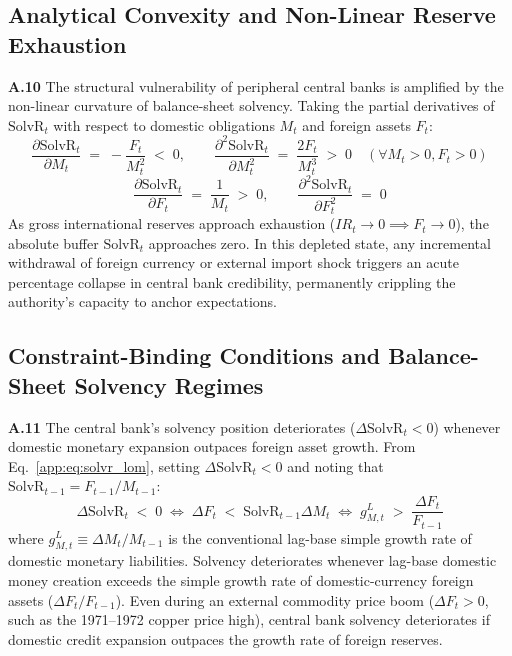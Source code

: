 \subsection{Analytical Convexity and Non-Linear Reserve Exhaustion}
\label{app:convexity}

\textbf{A.10} The structural vulnerability of peripheral central banks is amplified by the non-linear curvature of balance-sheet solvency. Taking the partial derivatives of $\text{SolvR}_t$ with respect to domestic obligations $M_t$ and foreign assets $F_t$:
\begin{equation}
	\label{app:eq:solvr_derivatives}
	\frac{\partial \text{SolvR}_t}{\partial M_t} \;=\; -\frac{F_t}{M_t^2} \;<\; 0, \qquad \frac{\partial^2 \text{SolvR}_t}{\partial M_t^2} \;=\; \frac{2 F_t}{M_t^3} \;>\; 0 \quad (\forall M_t > 0, F_t > 0)
\end{equation}
\begin{equation}
	\frac{\partial \text{SolvR}_t}{\partial F_t} \;=\; \frac{1}{M_t} \;>\; 0, \qquad \frac{\partial^2 \text{SolvR}_t}{\partial F_t^2} \;=\; 0
\end{equation}
As gross international reserves approach exhaustion ($IR_t \to 0 \implies F_t \to 0$), the absolute buffer $\text{SolvR}_t$ approaches zero. In this depleted state, any incremental withdrawal of foreign currency or external import shock triggers an acute percentage collapse in central bank credibility, permanently crippling the authority's capacity to anchor expectations.

\subsection{Constraint-Binding Conditions and Balance-Sheet Solvency Regimes}
\label{app:constraint_cases}

\textbf{A.11} The central bank's solvency position deteriorates ($\Delta\text{SolvR}_t < 0$) whenever domestic monetary expansion outpaces foreign asset growth. From Eq.~\eqref{app:eq:solvr_lom}, setting $\Delta\text{SolvR}_t < 0$ and noting that $\text{SolvR}_{t-1} = F_{t-1}/M_{t-1}$:
\begin{equation}
	\label{app:eq:binding}
	\Delta\text{SolvR}_t \;<\; 0 \;\iff\; \Delta F_t \;<\; \text{SolvR}_{t-1} \Delta M_t \;\iff\; g^L_{M,t} \;>\; \frac{\Delta F_t}{F_{t-1}}
\end{equation}
where $g^L_{M,t} \equiv \Delta M_t / M_{t-1}$ is the conventional lag-base simple growth rate of domestic monetary liabilities. Solvency deteriorates whenever lag-base domestic money creation exceeds the simple growth rate of domestic-currency foreign assets ($\Delta F_t / F_{t-1}$). Even during an external commodity price boom ($\Delta F_t > 0$, such as the 1971--1972 copper price high), central bank solvency deteriorates if domestic credit expansion outpaces the growth rate of foreign reserves.

